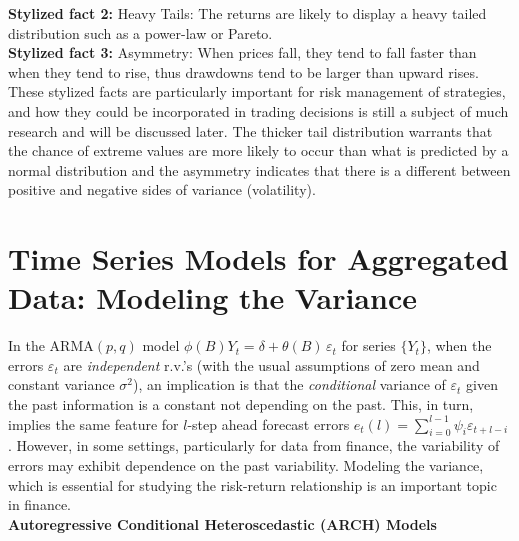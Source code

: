 \noindent\textbf{Stylized fact 2:} Heavy Tails: The returns are likely to display a heavy
tailed distribution such as a power-law or Pareto. \\


\noindent\textbf{Stylized fact 3:} Asymmetry: When prices fall, they tend to fall faster
than when they tend to rise, thus drawdowns tend to be larger than upward rises. \\


These stylized facts are particularly important for risk management of strategies, and how they could be incorporated in trading decisions is still a subject of much research and will be discussed later. The thicker tail distribution warrants that the chance of extreme values are more likely to occur than what is predicted by a normal distribution and the asymmetry indicates that there is a different between positive and negative sides of variance (volatility). 


\section{Time Series Models for Aggregated Data: Modeling the Variance}


In the ARMA$(p,q)$ model $\phi(B)Y_t= \delta + \theta(B) \,\varepsilon_t$ for series $\{Y_t\}$, when the errors $\varepsilon_t$ are \textit{independent} r.v.'s (with the usual assumptions of zero mean and constant variance $\sigma^2$), an implication is that the \textit{conditional} variance of $\varepsilon_t$ given the past information is a constant not depending on the past. This, in turn, implies the same feature for $l$-step ahead forecast errors $e_t(l) = \sum_{i=0}^{l-1}\psi_i\varepsilon_{t+l-i}$. However, in some settings, particularly for data from finance, the variability of errors may exhibit dependence on the past variability. Modeling the variance, which is essential for studying the risk-return relationship is an important topic in finance. \\


\noindent \textbf{Autoregressive Conditional Heteroscedastic (ARCH) Models} \\


